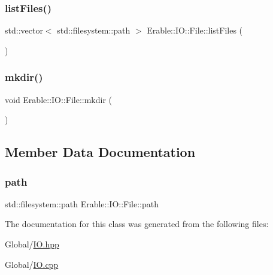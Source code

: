 \mbox{\label{class_erable_1_1_i_o_1_1_file_ab036bd4a721872729f009005d4945027}} 
\subsubsection{\texorpdfstring{listFiles()}{listFiles()}}
{\footnotesize\ttfamily std\+::vector$<$ std\+::filesystem\+::path $>$ Erable\+::\+I\+O\+::\+File\+::list\+Files (\begin{DoxyParamCaption}{ }\end{DoxyParamCaption})}

\mbox{\label{class_erable_1_1_i_o_1_1_file_ab3690b8b34c69e5fdeaa1919e0c2d65d}} 
\subsubsection{\texorpdfstring{mkdir()}{mkdir()}}
{\footnotesize\ttfamily void Erable\+::\+I\+O\+::\+File\+::mkdir (\begin{DoxyParamCaption}{ }\end{DoxyParamCaption})}



\subsection{Member Data Documentation}
\mbox{\label{class_erable_1_1_i_o_1_1_file_a9d9de3ccaf380aa8bd01338440a937cf}} 
\subsubsection{\texorpdfstring{path}{path}}
{\footnotesize\ttfamily std\+::filesystem\+::path Erable\+::\+I\+O\+::\+File\+::path\hspace{0.3cm}{\ttfamily [private]}}



The documentation for this class was generated from the following files\+:\begin{DoxyCompactItemize}
\item 
Global/\mbox{\hyperlink{_i_o_8hpp}{I\+O.\+hpp}}\item 
Global/\mbox{\hyperlink{_i_o_8cpp}{I\+O.\+cpp}}\end{DoxyCompactItemize}
